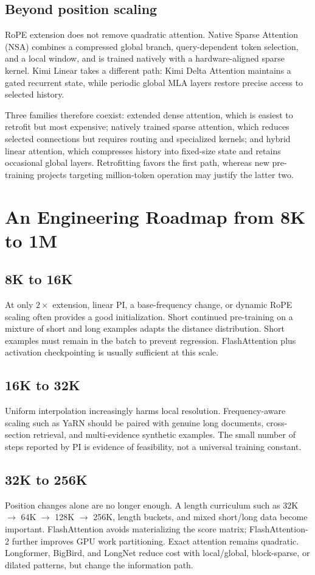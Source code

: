 \documentclass[UTF8,10pt,a4paper,fontset=none]{ctexart}
\begin{document}
\subsection{Beyond position scaling}
RoPE extension does not remove quadratic attention. Native Sparse Attention (NSA) combines a compressed global branch, query-dependent token selection, and a local window, and is trained natively with a hardware-aligned sparse kernel\cite{yuan2025nsa}. Kimi Linear takes a different path: Kimi Delta Attention maintains a gated recurrent state, while periodic global MLA layers restore precise access to selected history\cite{kimiLinear}.

Three families therefore coexist: extended dense attention, which is easiest to retrofit but most expensive; natively trained sparse attention, which reduces selected connections but requires routing and specialized kernels; and hybrid linear attention, which compresses history into fixed-size state and retains occasional global layers. Retrofitting favors the first path, whereas new pre-training projects targeting million-token operation may justify the latter two.

\section{An Engineering Roadmap from 8K to 1M}

\subsection{8K to 16K}
At only $2\times$ extension, linear PI, a base-frequency change, or dynamic RoPE scaling often provides a good initialization. Short continued pre-training on a mixture of short and long examples adapts the distance distribution. Short examples must remain in the batch to prevent regression. FlashAttention plus activation checkpointing is usually sufficient at this scale.

\subsection{16K to 32K}
Uniform interpolation increasingly harms local resolution. Frequency-aware scaling such as YaRN should be paired with genuine long documents, cross-section retrieval, and multi-evidence synthetic examples. The small number of steps reported by PI is evidence of feasibility, not a universal training constant.

\subsection{32K to 256K}
Position changes alone are no longer enough. A length curriculum such as 32K $\rightarrow$ 64K $\rightarrow$ 128K $\rightarrow$ 256K, length buckets, and mixed short/long data become important. FlashAttention avoids materializing the score matrix\cite{dao2022flash}; FlashAttention-2 further improves GPU work partitioning\cite{dao2023flash2}. Exact attention remains quadratic. Longformer, BigBird, and LongNet reduce cost with local/global, block-sparse, or dilated patterns\cite{beltagy2020longformer,zaheer2020bigbird,ding2023longnet}, but change the information path.
\end{document}
